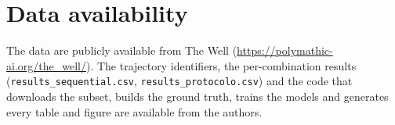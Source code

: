 \documentclass[final,5p,times,twocolumn]{elsarticle}
\begin{document}
\section*{Data availability}
The data are publicly available from The Well (\url{https://polymathic-ai.org/the_well/}). The trajectory identifiers, the per-combination results (\texttt{results\_sequential.csv}, \texttt{results\_protocolo.csv}) and the code that downloads the subset, builds the ground truth, trains the models and generates every table and figure are available from the authors.

\setlength{\bibsep}{1pt plus 0.5pt}


\end{document}
